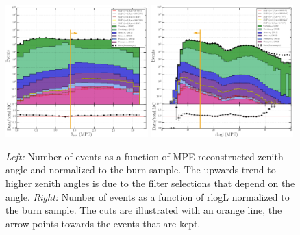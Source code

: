 \begin{figure}[ht]
\centering
\includegraphics[width=0.49\textwidth]{chapter8/img/1D_stack_mpefit_zenith_new.png}
\includegraphics[width=0.49\textwidth]{chapter8/img/1D_stack_mpefit_rlogl_new.png}
\caption{\textit{Left: }Number of events as a function of MPE reconstructed zenith angle and normalized to the burn sample. The upwards trend to higher zenith angles is due to the filter selections that depend on the angle. \textit{Right: }Number of events as a function of rlogL normalized to the burn sample. The cuts are illustrated with an orange line, the arrow points towards the events that are kept.}
\label{fig:level3cuts1}
\end{figure}

